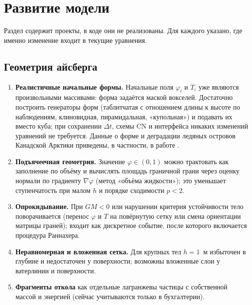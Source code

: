 \documentclass[12pt,a4paper]{article}
\begin{document}
\section{Развитие модели}\label{sec:future}

Раздел содержит проекты, в коде они не реализованы. Для каждого указано, где именно изменение входит в текущие уравнения.

\subsection{Геометрия айсберга}
\begin{enumerate}
\item \textbf{Реалистичные начальные формы.} Начальные поля $\varphi_i$ и $T_i$ уже являются произвольными массивами: форма задаётся маской вокселей. Достаточно построить генераторы форм (таблитчатая с отношением длины к высоте по наблюдениям, клиновидная, пирамидальная, «купольная») и подавать их вместо куба; при сохранении $\Delta t$, схемы CN и интерфейса никаких изменений уравнений не требуется. Данные о форме и деградации ледяных островов Канадской Арктики приведены, в частности, в работе \cite{crawford2013}.
\item \textbf{Подъячеечная геометрия.} Значение $\varphi\in(0,1)$ можно трактовать как заполнение по объёму и вычислять площадь граничной грани через оценку нормали по градиенту $\nabla\varphi$ (метод «объёма жидкости»); это уменьшает ступенчатость при малом $h$ и порядке сходимости $p<2$.
\item \textbf{Опрокидывание.} При $GM<0$ или нарушении критерия устойчивости \cite{wagner2017} тело поворачивается (перенос $\varphi$ и $T$ на повёрнутую сетку или смена ориентации матрицы граней); входит как дискретное событие, после которого включается процедура Раннахера.
\item \textbf{Неравномерная и вложенная сетка.} Для крупных тел $h=1$~м избыточен в глубине и недостаточен у поверхности; возможны вложенные слои у ватерлинии и поверхности.
\item \textbf{Фрагменты откола} как отдельные лагранжевы частицы с собственной массой и энергией (сейчас учитываются только в бухгалтерии).
\end{enumerate}
\end{document}
